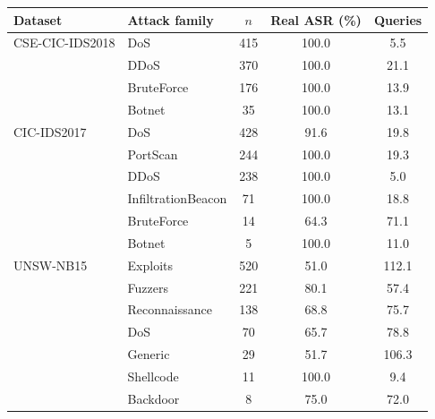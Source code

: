 \begin{tabular}{@{}llccc@{}}
\toprule
\textbf{Dataset} & \textbf{Attack family} & \textbf{$n$} & \textbf{Real ASR (\%)} & \textbf{Queries} \\
\midrule
CSE-CIC-IDS2018 & DoS & 415 & 100.0 & 5.5 \\
 & DDoS & 370 & 100.0 & 21.1 \\
 & BruteForce & 176 & 100.0 & 13.9 \\
 & Botnet & 35 & 100.0 & 13.1 \\
\midrule
CIC-IDS2017 & DoS & 428 & 91.6 & 19.8 \\
 & PortScan & 244 & 100.0 & 19.3 \\
 & DDoS & 238 & 100.0 & 5.0 \\
 & InfiltrationBeacon & 71 & 100.0 & 18.8 \\
 & BruteForce & 14 & 64.3 & 71.1 \\
 & Botnet & 5 & 100.0 & 11.0 \\
\midrule
UNSW-NB15 & Exploits & 520 & 51.0 & 112.1 \\
 & Fuzzers & 221 & 80.1 & 57.4 \\
 & Reconnaissance & 138 & 68.8 & 75.7 \\
 & DoS & 70 & 65.7 & 78.8 \\
 & Generic & 29 & 51.7 & 106.3 \\
 & Shellcode & 11 & 100.0 & 9.4 \\
 & Backdoor & 8 & 75.0 & 72.0 \\
\bottomrule
\end{tabular}
